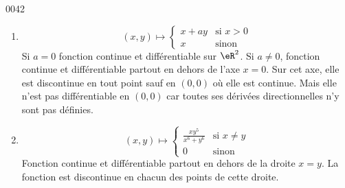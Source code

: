 \begin{corrige}{0042}
\begin{alternative}
\begin{enumerate}
\item
    \begin{equation}
        (x,y)\mapsto\begin{cases}
            x+ay    &   \text{si } x>0\\
            x    &    \text{sinon}
        \end{cases}
    \end{equation}
Si $a=0$ fonction continue et différentiable sur $\eR^2$. Si $a\neq0$, fonction continue et différentiable partout en dehors de l'axe $x=0$. Sur cet axe, elle est discontinue en tout point sauf en $(0,0)$ o\`{u} elle est continue. Mais elle n'est pas différentiable en $(0,0)$ car toutes ses dérivées directionnelles  n'y sont pas définies.
	      
\item
    \begin{equation}
        (x,y)\mapsto\begin{cases}
            \frac{ xy^5 }{ x^6+y^6 }    &   \text{si } x\neq y\\
            0    &    \text{sinon}
        \end{cases}
    \end{equation}
Fonction continue et différentiable partout en dehors de la droite $x=y$.  La fonction est discontinue en chacun des points de cette droite.

\end{enumerate}
\end{alternative}

\end{corrige}
